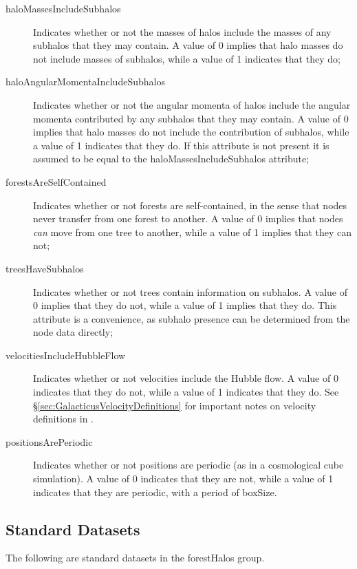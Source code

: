 \begin{description}
 \item [{\normalfont \ttfamily haloMassesIncludeSubhalos}] Indicates whether or not the masses of halos include the masses of any subhalos that they may contain. A value of 0 implies that halo masses do not include masses of subhalos, while a value of 1 indicates that they do;
 \item [{\normalfont \ttfamily haloAngularMomentaIncludeSubhalos}] Indicates whether or not the angular momenta of halos include the angular momenta contributed by any subhalos that they may contain. A value of 0 implies that halo masses do not include the contribution of subhalos, while a value of 1 indicates that they do. If this attribute is not present it is assumed to be equal to the {\normalfont \ttfamily haloMassesIncludeSubhalos} attribute;
 \item [{\normalfont \ttfamily forestsAreSelfContained}] Indicates whether or not forests are self-contained, in the sense that nodes never transfer from one forest to another. A value of 0 implies that nodes \emph{can} move from one tree to another, while a value of 1 implies that they can not;
 \item [{\normalfont \ttfamily treesHaveSubhalos}] Indicates whether or not trees contain information on subhalos. A value of 0 implies that they do not, while a value of 1 implies that they do. This attribute is a convenience, as subhalo presence can be determined from the node data directly;
 \item [{\normalfont \ttfamily velocitiesIncludeHubbleFlow}] Indicates whether or not velocities include the Hubble flow. A value of 0 indicates that they do not, while a value of 1 indicates that they do. See \S\ref{sec:GalacticusVelocityDefinitions} for important notes on velocity definitions in \glc.
 \item [{\normalfont \ttfamily positionsArePeriodic}] Indicates whether or not positions are periodic (as in a cosmological cube simulation). A value of 0 indicates that they are not, while a value of 1 indicates that they are periodic, with a period of {\normalfont \ttfamily boxSize}.
\end{description}

\subsection{Standard Datasets}

The following are standard datasets in the {\normalfont \ttfamily forestHalos} group.

